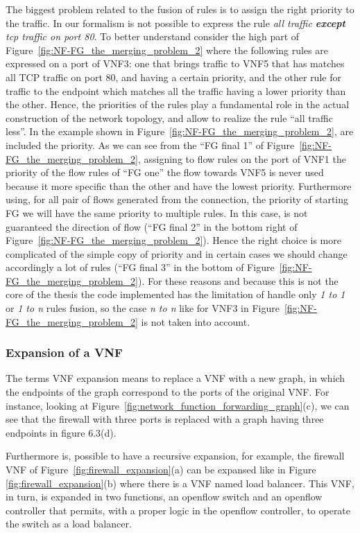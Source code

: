 The biggest problem related to the fusion of rules is to assign the right priority to the traffic. In our formalism is not possible to express the rule \textit{all traffic \textbf{except} tcp traffic on port 80}. To better understand consider the high part of Figure~\ref{fig:NF-FG_the_merging_problem_2} where the following rules are expressed on a port of VNF3: one that brings traffic to VNF5 that has matches all TCP traffic on port 80, and having a certain priority, and the other rule for traffic to the endpoint  which matches all the traffic having a lower priority than the other. Hence, the priorities of the rules play a fundamental role in the actual construction of the network topology, and allow to realize the rule ``all traffic less''.
In the example shown in Figure~\ref{fig:NF-FG_the_merging_problem_2}, are included the  priority. As we can see from the ``FG final 1'' of Figure~\ref{fig:NF-FG_the_merging_problem_2}, assigning to flow rules on the port of VNF1 the priority of the flow rules of ``FG one'' the flow towards VNF5 is never used because it more specific than the other and have the lowest priority. Furthermore using, for all pair of flows generated from the connection, the priority of starting FG we will have the same priority to multiple rules. In this case, is not guaranteed the direction of flow (``FG final 2'' in the bottom right of Figure~\ref{fig:NF-FG_the_merging_problem_2}). Hence the right choice is more complicated of the simple copy of priority and in certain cases we should change accordingly a lot of rules (``FG final 3'' in the bottom of Figure~\ref{fig:NF-FG_the_merging_problem_2}). For these reasons and because this is not the core of the thesis the code implemented has the limitation of handle
only \textit{1 to 1} or \textit{1 to n} rules fusion, so the case \textit{n to n} like for VNF3 in Figure~\ref{fig:NF-FG_the_merging_problem_2} is not taken into account.

\subsubsection{Expansion of a VNF}
The terms VNF expansion means to replace a VNF with a new graph, in which the endpoints of the graph  correspond to the ports of the original VNF. For instance, looking at Figure~\ref{fig:network_function_forwarding_graph}(c), we can see that the firewall with three ports is replaced with a graph having three endpoints in figure 6.3(d).

%
Furthermore is, possible to have a recursive expansion, for example, the firewall VNF of Figure~\ref{fig:firewall_expansion}(a) can be expansed like in Figure \ref{fig:firewall_expansion}{(b)} where there is a VNF named load balancer. This VNF, in turn,  is expanded in two functions, an openflow switch and an openflow controller that permits, with a proper logic in the openflow controller, to operate the switch as a load balancer.

